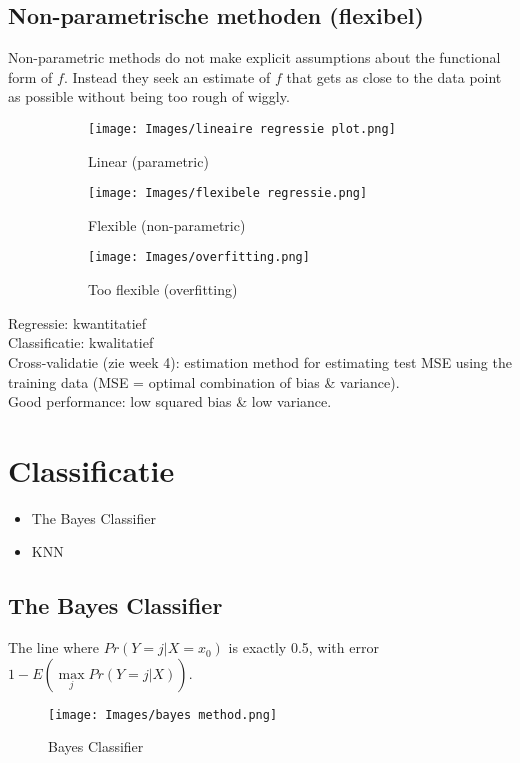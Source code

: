 {\subsection{Non-parametrische methoden (flexibel)}
Non-parametric methods do not make explicit assumptions about the functional form of $f$. Instead they seek an estimate of $f$ that gets as close to the data point as possible without being too rough of wiggly.
\begin{figure}[h!]
    \centering
    \begin{subfigure}{0.3\textwidth}
        \centering
        \texttt{[image: Images/lineaire regressie plot.png]}
        \caption{Linear (parametric)}
        \label{fig:parametric}
    \end{subfigure}
    \:
    \begin{subfigure}{0.3\textwidth}
        \centering
        \texttt{[image: Images/flexibele regressie.png]}
        \caption{Flexible (non-parametric)}
        \label{fig:non-parametric}
    \end{subfigure}
    \:
    \begin{subfigure}{0.3\textwidth}
        \centering
        \texttt{[image: Images/overfitting.png]}
        \caption{Too flexible (overfitting)}
        \label{fig:overfitting}
    \end{subfigure}
    \caption*{}\vspace{-3mm}
    \label{fig:3dplots}
\end{figure}

\noindent Regressie: kwantitatief\\
Classificatie: kwalitatief\\

\noindent Cross-validatie (zie week 4): estimation method for estimating test MSE using the training data (MSE = optimal combination of bias \& variance).\\
Good performance: low squared bias \& low variance.

\section{Classificatie}
\begin{itemize}
    \item The Bayes Classifier
    \item KNN
\end{itemize}

\subsection{The Bayes Classifier}
The line where $Pr(Y=j|X=x_0)$ is exactly 0.5, with error $1-E(\max\limits_{j}Pr(Y=j|X))$.
\begin{figure}[h]
    \centering
    \texttt{[image: Images/bayes method.png]}
    \caption{Bayes Classifier}
    \label{fig:knn}
\end{figure}
}
